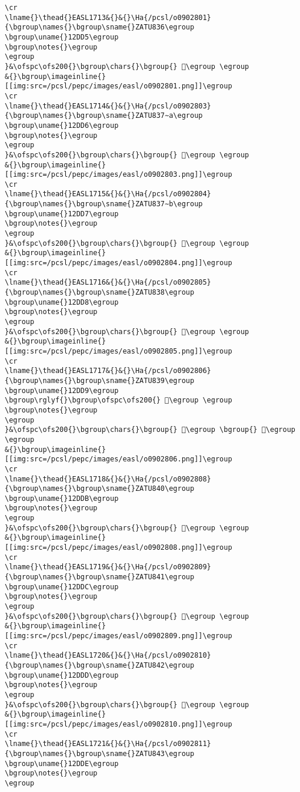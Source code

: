 \begin{verbatim}
\cr
\lname{}\thead{}EASL1713&{}&{}\Ha{/pcsl/o0902801}{\bgroup\names{}\bgroup\sname{}ZATU836\egroup
\bgroup\uname{}12DD5\egroup
\bgroup\notes{}\egroup
\egroup
}&\ofspc\ofs200{}\bgroup\chars{}\bgroup{} 𒷕\egroup \egroup
&{}\bgroup\imageinline{}[[img:src=/pcsl/pepc/images/easl/o0902801.png]]\egroup
\cr
\lname{}\thead{}EASL1714&{}&{}\Ha{/pcsl/o0902803}{\bgroup\names{}\bgroup\sname{}ZATU837∼a\egroup
\bgroup\uname{}12DD6\egroup
\bgroup\notes{}\egroup
\egroup
}&\ofspc\ofs200{}\bgroup\chars{}\bgroup{} 𒷖\egroup \egroup
&{}\bgroup\imageinline{}[[img:src=/pcsl/pepc/images/easl/o0902803.png]]\egroup
\cr
\lname{}\thead{}EASL1715&{}&{}\Ha{/pcsl/o0902804}{\bgroup\names{}\bgroup\sname{}ZATU837∼b\egroup
\bgroup\uname{}12DD7\egroup
\bgroup\notes{}\egroup
\egroup
}&\ofspc\ofs200{}\bgroup\chars{}\bgroup{} 𒷗\egroup \egroup
&{}\bgroup\imageinline{}[[img:src=/pcsl/pepc/images/easl/o0902804.png]]\egroup
\cr
\lname{}\thead{}EASL1716&{}&{}\Ha{/pcsl/o0902805}{\bgroup\names{}\bgroup\sname{}ZATU838\egroup
\bgroup\uname{}12DD8\egroup
\bgroup\notes{}\egroup
\egroup
}&\ofspc\ofs200{}\bgroup\chars{}\bgroup{} 𒷘\egroup \egroup
&{}\bgroup\imageinline{}[[img:src=/pcsl/pepc/images/easl/o0902805.png]]\egroup
\cr
\lname{}\thead{}EASL1717&{}&{}\Ha{/pcsl/o0902806}{\bgroup\names{}\bgroup\sname{}ZATU839\egroup
\bgroup\uname{}12DD9\egroup
\bgroup\rglyf{}\bgroup\ofspc\ofs200{} 𒷙\egroup \egroup
\bgroup\notes{}\egroup
\egroup
}&\ofspc\ofs200{}\bgroup\chars{}\bgroup{} 𒷙\egroup \bgroup{} 𒷚\egroup \egroup
&{}\bgroup\imageinline{}[[img:src=/pcsl/pepc/images/easl/o0902806.png]]\egroup
\cr
\lname{}\thead{}EASL1718&{}&{}\Ha{/pcsl/o0902808}{\bgroup\names{}\bgroup\sname{}ZATU840\egroup
\bgroup\uname{}12DDB\egroup
\bgroup\notes{}\egroup
\egroup
}&\ofspc\ofs200{}\bgroup\chars{}\bgroup{} 𒷛\egroup \egroup
&{}\bgroup\imageinline{}[[img:src=/pcsl/pepc/images/easl/o0902808.png]]\egroup
\cr
\lname{}\thead{}EASL1719&{}&{}\Ha{/pcsl/o0902809}{\bgroup\names{}\bgroup\sname{}ZATU841\egroup
\bgroup\uname{}12DDC\egroup
\bgroup\notes{}\egroup
\egroup
}&\ofspc\ofs200{}\bgroup\chars{}\bgroup{} 𒷜\egroup \egroup
&{}\bgroup\imageinline{}[[img:src=/pcsl/pepc/images/easl/o0902809.png]]\egroup
\cr
\lname{}\thead{}EASL1720&{}&{}\Ha{/pcsl/o0902810}{\bgroup\names{}\bgroup\sname{}ZATU842\egroup
\bgroup\uname{}12DDD\egroup
\bgroup\notes{}\egroup
\egroup
}&\ofspc\ofs200{}\bgroup\chars{}\bgroup{} 𒷝\egroup \egroup
&{}\bgroup\imageinline{}[[img:src=/pcsl/pepc/images/easl/o0902810.png]]\egroup
\cr
\lname{}\thead{}EASL1721&{}&{}\Ha{/pcsl/o0902811}{\bgroup\names{}\bgroup\sname{}ZATU843\egroup
\bgroup\uname{}12DDE\egroup
\bgroup\notes{}\egroup
\egroup

\end{verbatim}
